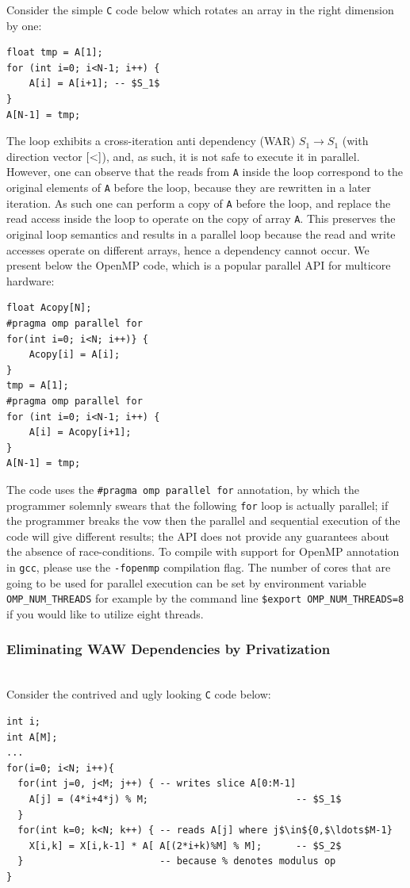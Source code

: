 \documentclass[acmsmall,review]{acmart}\settopmatter{printfolios=true,printccs=false,printacmref=false}
\begin{document}
Consider the simple {\tt C} code below which rotates an array in
the right dimension by one:
\begin{lstlisting}[mathescape=true]
float tmp = A[1];
for (int i=0; i<N-1; i++) {
    A[i] = A[i+1]; -- $S_1$   
}
A[N-1] = tmp;
\end{lstlisting}\vspace{-2ex}
The loop exhibits a cross-iteration anti dependency (WAR)
$S_1\to S_1$ (with direction vector ${\tt[<]}$), and, as 
such, it is not safe to execute it in parallel. However, 
one can observe that the reads from {\tt A} inside the loop
correspond to the original elements of {\tt A} before
the loop, because they are rewritten in a later iteration.
As such one can perform a copy of {\tt A} before the loop, 
and replace the read access inside the loop to operate on 
the copy of array {\tt A}. This preserves the original 
loop semantics and results in a parallel loop because
the read and write accesses operate on different arrays,
hence a dependency cannot occur. We present below the
OpenMP code, which is a popular parallel API for multicore 
hardware:
\begin{lstlisting}[mathescape=true]
float Acopy[N];
#pragma omp parallel for
for(int i=0; i<N; i++)} {
    Acopy[i] = A[i];
}
tmp = A[1];
#pragma omp parallel for
for (int i=0; i<N-1; i++) {
    A[i] = Acopy[i+1];
}
A[N-1] = tmp;
\end{lstlisting}\vspace{-2ex}
The code uses the {\tt\#pragma omp parallel for} annotation,
by which the programmer solemnly swears that the following
\lstinline{for} loop is actually parallel; if the programmer
breaks the vow then the parallel and sequential execution of
the code will give different results; the API does not provide
any guarantees about the absence of race-conditions. 
To compile with support for OpenMP annotation in {\tt gcc},
please use the {\tt-fopenmp} compilation flag. The number
of cores that are going to be used for parallel execution
can be set by environment variable {\tt OMP\_NUM\_THREADS}
for example by the command line {\tt\$export OMP\_NUM\_THREADS=8}
if you would like to utilize eight threads.

\subsubsection{Eliminating WAW Dependencies by Privatization}
$\mbox{ }$\\

Consider the contrived and ugly looking {\tt C} code below:
\begin{lstlisting}[mathescape=true]
int i;
int A[M];
...
for(i=0; i<N; i++){
  for(int j=0, j<M; j++) { -- writes slice A[0:M-1]
    A[j] = (4*i+4*j) % M;                          -- $S_1$
  } 
  for(int k=0; k<N; k++) { -- reads A[j] where j$\in${0,$\ldots$M-1}
    X[i,k] = X[i,k-1] * A[ A[(2*i+k)%M] % M];      -- $S_2$
  }                        -- because % denotes modulus op 
}
\end{lstlisting}\vspace{-2ex}
\end{document}
